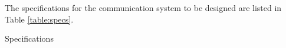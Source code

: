 The specifications for the communication system to be designed are listed in Table \ref{table:specs}.

\begin{table}[ht!]
\centering

\caption{Specifications}
\label{table:specs}	
\end{table}
